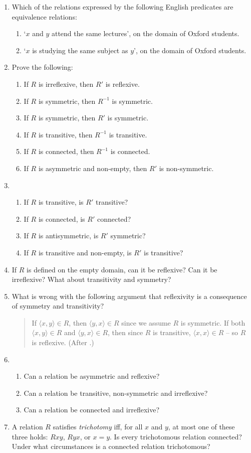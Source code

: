 {\begin{enumerate}
\item Which of the relations expressed by the following English predicates are equivalence relations: \begin{enumerate}
  \item `$x$ and $y$ attend the same lectures', on the domain of Oxford students.
  \item `$x$ is studying the same subject as $y$', on the domain of Oxford students.
\end{enumerate}
\item Prove the following: \begin{enumerate}
\item If $R$ is irreflexive, then $R'$ is reflexive.
  \item If $R$ is symmetric, then $R^{-1}$ is symmetric.
  \item If $R$ is symmetric, then $R'$ is symmetric.
  \item If $R$ is transitive, then $R^{-1}$ is transitive.
  \item If $R$ is connected, then $R^{-1}$ is connected.
  \item If $R$ is asymmetric and non-empty, then $R'$ is non-symmetric.
\end{enumerate}
\item \begin{enumerate}
  \item If $R$ is transitive, is $R'$ transitive?
  \item If $R$ is connected, is $R'$ connected?
  \item If $R$ is antisymmetric, is $R'$ symmetric?
  \item If $R$ is transitive and non-empty, is $R'$ is transitive?
\end{enumerate}
\item If $R$ is defined on the empty domain, 
    can it be reflexive? Can it be irreflexive? What about
    transitivity and symmetry?
\item What is wrong with the following argument that reflexivity is a consequence of symmetry and transitivity? \begin{quote}
  If $\langle x,y\rangle \in R$, then $\langle y,x\rangle\in R$ since we assume $R$ is symmetric. If both $\langle x,y\rangle\in R$ and $\langle y,x\rangle \in R$, then since $R$ is transitive, $\langle x,x\rangle\in R$ – so $R$ is reflexive. (After \citealt[p.\ 52]{pmwmatmel}.)
\end{quote} 
\item \begin{enumerate}
  \item Can a relation be asymmetric and reflexive?
  \item Can a relation 
      be transitive, non-symmetric and irreflexive?
  \item   Can a relation 
        be connected and irreflexive?
\end{enumerate}  
\item  A relation $R$ satisfies \emph{trichotomy} iff, for all $x$ and $y$, at most one of these three holds: $Rxy$, $Ryx$, or $x=y$. Is every trichotomous relation connected? Under what circumstances is a connected relation trichotomous?



\end{enumerate}}
